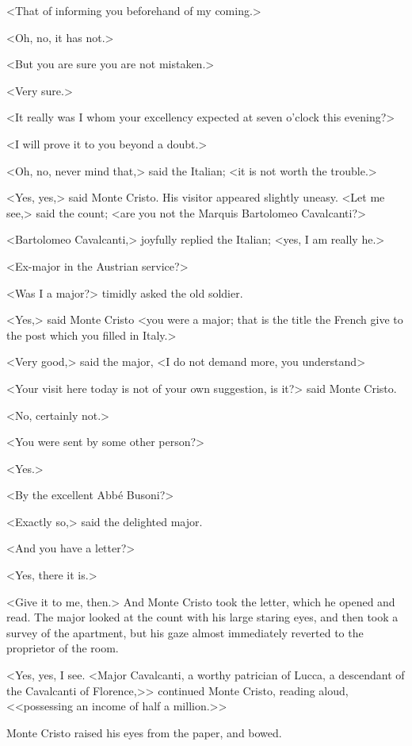  <That of informing you beforehand of my coming.> 

 <Oh, no, it has not.> 

 <But you are sure you are not mistaken.> 

 <Very sure.> 

 <It really was I whom your excellency expected at seven o'clock this evening?> 

 <I will prove it to you beyond a doubt.> 

 <Oh, no, never mind that,> said the Italian; <it is not worth the trouble.> 

 <Yes, yes,> said Monte Cristo. His visitor appeared slightly uneasy. <Let me see,> said the count; <are you not the Marquis Bartolomeo Cavalcanti?> 

 <Bartolomeo Cavalcanti,> joyfully replied the Italian; <yes, I am really he.> 

 <Ex-major in the Austrian service?> 

 <Was I a major?> timidly asked the old soldier. 

 <Yes,> said Monte Cristo <you were a major; that is the title the French give to the post which you filled in Italy.> 

 <Very good,> said the major, <I do not demand more, you understand\longdash> 

 <Your visit here today is not of your own suggestion, is it?> said Monte Cristo. 

 <No, certainly not.> 

 <You were sent by some other person?> 

 <Yes.> 

 <By the excellent Abbé Busoni?> 

 <Exactly so,> said the delighted major. 

 <And you have a letter?> 

 <Yes, there it is.> 

 <Give it to me, then.> And Monte Cristo took the letter, which he opened and read. The major looked at the count with his large staring eyes, and then took a survey of the apartment, but his gaze almost immediately reverted to the proprietor of the room. 

 <Yes, yes, I see. <Major Cavalcanti, a worthy patrician of Lucca, a descendant of the Cavalcanti of Florence,>> continued Monte Cristo, reading aloud, <<possessing an income of half a million.>> 

 Monte Cristo raised his eyes from the paper, and bowed. 

